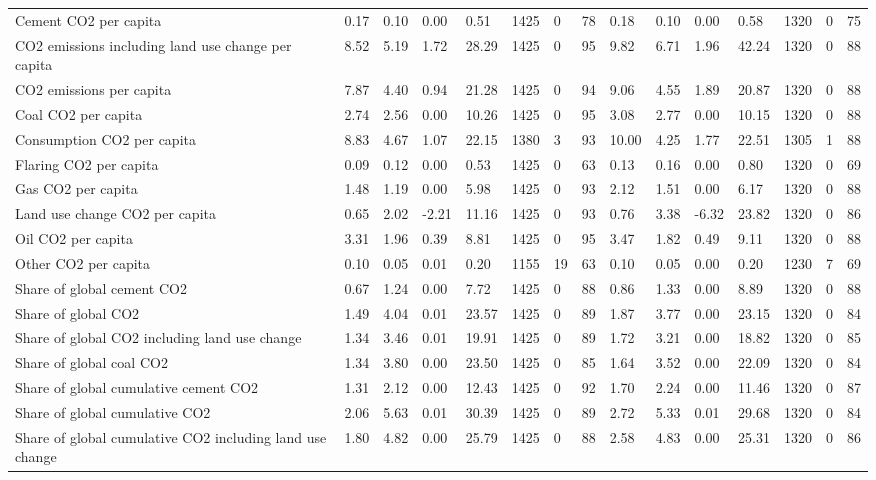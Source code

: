\begin{longtable}{lllllllllllllll}
Cement CO2 per capita & 0.17 & 0.10 & 0.00 & 0.51 & 1425 & 0 & 78 & 0.18 & 0.10 & 0.00 & 0.58 & 1320 & 0 & 75\\
CO2 emissions including land use change per capita & 8.52 & 5.19 & 1.72 & 28.29 & 1425 & 0 & 95 & 9.82 & 6.71 & 1.96 & 42.24 & 1320 & 0 & 88\\
CO2 emissions per capita & 7.87 & 4.40 & 0.94 & 21.28 & 1425 & 0 & 94 & 9.06 & 4.55 & 1.89 & 20.87 & 1320 & 0 & 88\\
Coal CO2 per capita & 2.74 & 2.56 & 0.00 & 10.26 & 1425 & 0 & 95 & 3.08 & 2.77 & 0.00 & 10.15 & 1320 & 0 & 88\\
\addlinespace
Consumption CO2 per capita & 8.83 & 4.67 & 1.07 & 22.15 & 1380 & 3 & 93 & 10.00 & 4.25 & 1.77 & 22.51 & 1305 & 1 & 88\\
Flaring CO2 per capita & 0.09 & 0.12 & 0.00 & 0.53 & 1425 & 0 & 63 & 0.13 & 0.16 & 0.00 & 0.80 & 1320 & 0 & 69\\
Gas CO2 per capita & 1.48 & 1.19 & 0.00 & 5.98 & 1425 & 0 & 93 & 2.12 & 1.51 & 0.00 & 6.17 & 1320 & 0 & 88\\
Land use change CO2 per capita & 0.65 & 2.02 & -2.21 & 11.16 & 1425 & 0 & 93 & 0.76 & 3.38 & -6.32 & 23.82 & 1320 & 0 & 86\\
Oil CO2 per capita & 3.31 & 1.96 & 0.39 & 8.81 & 1425 & 0 & 95 & 3.47 & 1.82 & 0.49 & 9.11 & 1320 & 0 & 88\\
\addlinespace
Other CO2 per capita & 0.10 & 0.05 & 0.01 & 0.20 & 1155 & 19 & 63 & 0.10 & 0.05 & 0.00 & 0.20 & 1230 & 7 & 69\\
Share of global cement CO2 & 0.67 & 1.24 & 0.00 & 7.72 & 1425 & 0 & 88 & 0.86 & 1.33 & 0.00 & 8.89 & 1320 & 0 & 88\\
Share of global CO2 & 1.49 & 4.04 & 0.01 & 23.57 & 1425 & 0 & 89 & 1.87 & 3.77 & 0.00 & 23.15 & 1320 & 0 & 84\\
Share of global CO2 including land use change & 1.34 & 3.46 & 0.01 & 19.91 & 1425 & 0 & 89 & 1.72 & 3.21 & 0.00 & 18.82 & 1320 & 0 & 85\\
Share of global coal CO2 & 1.34 & 3.80 & 0.00 & 23.50 & 1425 & 0 & 85 & 1.64 & 3.52 & 0.00 & 22.09 & 1320 & 0 & 84\\
\addlinespace
Share of global cumulative cement CO2 & 1.31 & 2.12 & 0.00 & 12.43 & 1425 & 0 & 92 & 1.70 & 2.24 & 0.00 & 11.46 & 1320 & 0 & 87\\
Share of global cumulative CO2 & 2.06 & 5.63 & 0.01 & 30.39 & 1425 & 0 & 89 & 2.72 & 5.33 & 0.01 & 29.68 & 1320 & 0 & 84\\
Share of global cumulative CO2 including land use change & 1.80 & 4.82 & 0.00 & 25.79 & 1425 & 0 & 88 & 2.58 & 4.83 & 0.00 & 25.31 & 1320 & 0 & 86\\

\end{longtable}

